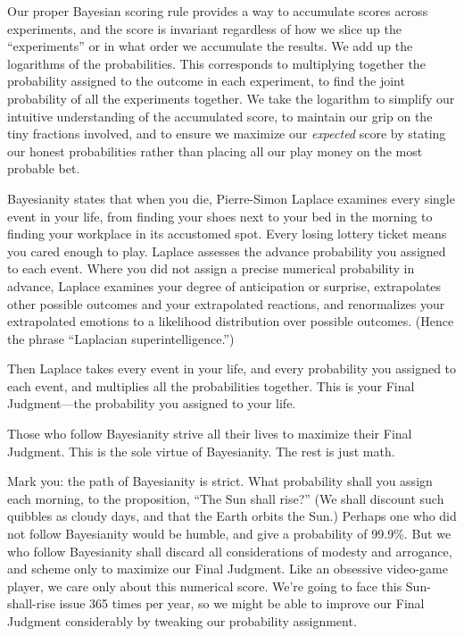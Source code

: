 {
 Our proper Bayesian scoring rule provides a way to accumulate
scores across experiments, and the score is invariant regardless of how
we slice up the ``experiments'' or
in what order we accumulate the results. We add up the logarithms of
the probabilities. This corresponds to multiplying together the
probability assigned to the outcome in each experiment, to find the
joint probability of all the experiments together. We take the
logarithm to simplify our intuitive understanding of the accumulated
score, to maintain our grip on the tiny fractions involved, and to
ensure we maximize our \textit{expected} score by stating our honest
probabilities rather than placing all our play money on the most
probable bet.}

{
 Bayesianity states that when you die, Pierre-Simon Laplace
examines every single event in your life, from finding your shoes next
to your bed in the morning to finding your workplace in its accustomed
spot. Every losing lottery ticket means you cared enough to play.
Laplace assesses the advance probability you assigned to each event.
Where you did not assign a precise numerical probability in advance,
Laplace examines your degree of anticipation or surprise, extrapolates
other possible outcomes and your extrapolated reactions, and
renormalizes your extrapolated emotions to a likelihood distribution
over possible outcomes. (Hence the phrase ``Laplacian
superintelligence.'')}

{
 Then Laplace takes every event in your life, and every probability
you assigned to each event, and multiplies all the probabilities
together. This is your Final Judgment---the probability you assigned to
your life.}

{
 Those who follow Bayesianity strive all their lives to maximize
their Final Judgment. This is the sole virtue of Bayesianity. The rest
is just math.}

{
 Mark you: the path of Bayesianity is strict. What probability
shall you assign each morning, to the proposition,
``The Sun shall rise?'' (We shall
discount such quibbles as cloudy days, and that the Earth orbits the
Sun.) Perhaps one who did not follow Bayesianity would be humble, and
give a probability of 99.9\%. But we who follow Bayesianity shall
discard all considerations of modesty and arrogance, and scheme only to
maximize our Final Judgment. Like an obsessive video-game player, we
care only about this numerical score. We're going to
face this Sun-shall-rise issue 365 times per year, so we might be able
to improve our Final Judgment considerably by tweaking our probability
assignment.}

